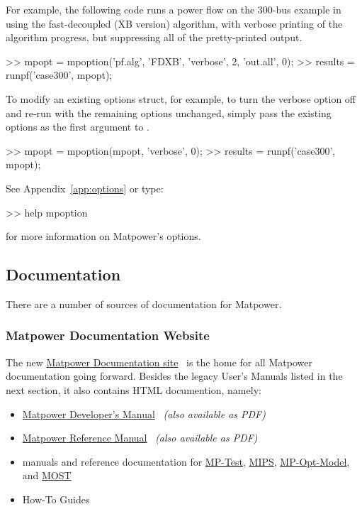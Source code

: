\documentclass[12pt]{article}
\newcommand{\matpower}[0]{{\sc Matpower}}
\newcommand{\mptest}[0]{{MP-Test}}
\newcommand{\mptesturl}[0]{https://github.com/MATPOWER/mptest}
\newcommand{\mptestlink}[0]{\href{\mptesturl}{\mptest{}}}
\newcommand{\mips}[0]{{MIPS}}
\newcommand{\mipsurl}[0]{https://github.com/MATPOWER/mips}
\newcommand{\mipslink}[0]{\href{\mipsurl}{\mips{}}}
\newcommand{\mpom}[0]{\mbox{MP-Opt-Model}}
\newcommand{\mpomurl}[0]{https://github.com/MATPOWER/mp-opt-model}
\newcommand{\mpomlink}[0]{\href{\mpomurl}{\mpom{}}}
\newcommand{\most}[0]{{MOST}}
\newcommand{\mosturl}[0]{https://github.com/MATPOWER/most}
\newcommand{\mostlink}[0]{\href{\mosturl}{\most{}}}
\newcommand{\code}[1]{{\relsize{-0.5}{\tt{{#1}}}}}  %
\newcommand{\mdmurl}[0]{https://matpower.org/doc/dev-manual}
\newcommand{\mdm}[0]{\href{\mdmurl}{\matpower{} Developer's Manual}}
\newcommand{\mrmurl}[0]{https://matpower.org/doc/ref-manual}
\newcommand{\mrm}[0]{\href{\mrmurl}{\matpower{} Reference Manual}}
\numberwithin{equation}{section}
\numberwithin{table}{section}
\numberwithin{figure}{section}
\begin{document}
For example, the following code runs a power flow on the 300-bus example in \code{case300.m} using the fast-decoupled (XB version) algorithm, with verbose printing of the algorithm progress, but suppressing all of the pretty-printed output.
\begin{Code}
>> mpopt = mpoption('pf.alg', 'FDXB', 'verbose', 2, 'out.all', 0);
>> results = runpf('case300', mpopt);
\end{Code}

To modify an existing options struct, for example, to turn the verbose option off and re-run with the remaining options unchanged, simply pass the existing options as the first argument to \code{mpoption}.

\begin{Code}
>> mpopt = mpoption(mpopt, 'verbose', 0);
>> results = runpf('case300', mpopt);
\end{Code}

See Appendix~\ref{app:options} or type:
\begin{Code}
>> help mpoption
\end{Code}
for more information on \matpower{}'s options.


\subsection{Documentation}
\label{sec:documentation}

There are a number of sources of documentation for \matpower{}.

\subsubsection{\matpower{} Documentation Website}

The new \href{https://matpower.org/doc/}{\matpower{} Documentation site}~\cite{mp_docs} is the home for all \matpower{} documentation going forward. Besides the legacy User's Manuals listed in the next section, it also contains HTML documention, namely:
\begin{itemize}
\item \mdm{}~\cite{dev_manual} \emph{(also available as PDF)}
\item \mrm{}~\cite{ref_manual} \emph{(also available as PDF)}
\item manuals and reference documentation for \mptestlink{}, \mipslink{}, \mpomlink{}, and \mostlink{}
\item How-To Guides
\end{itemize}
\end{document}
